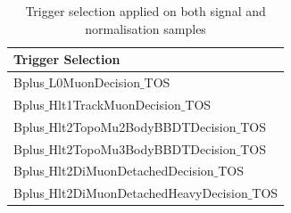 \begin{table}[h!]
\begin{center}
	\begin{tabular}{ l }%
Trigger Selection  \\ %
\hline
Bplus$\_$L0MuonDecision$\_$TOS \\ %
\hline
Bplus$\_$Hlt1TrackMuonDecision$\_$TOS \\%
\hline
Bplus$\_$Hlt2TopoMu2BodyBBDTDecision$\_$TOS \\ %
Bplus$\_$Hlt2TopoMu3BodyBBDTDecision$\_$TOS \\ %
Bplus$\_$Hlt2DiMuonDetachedDecision$\_$TOS \\ %
Bplus$\_$Hlt2DiMuonDetachedHeavyDecision$\_$TOS \\ %
\hline
\end{tabular}
\end{center}
	\caption{Trigger selection applied on both signal and normalisation samples}
	\label{tab:triggersel}
\end{table}


